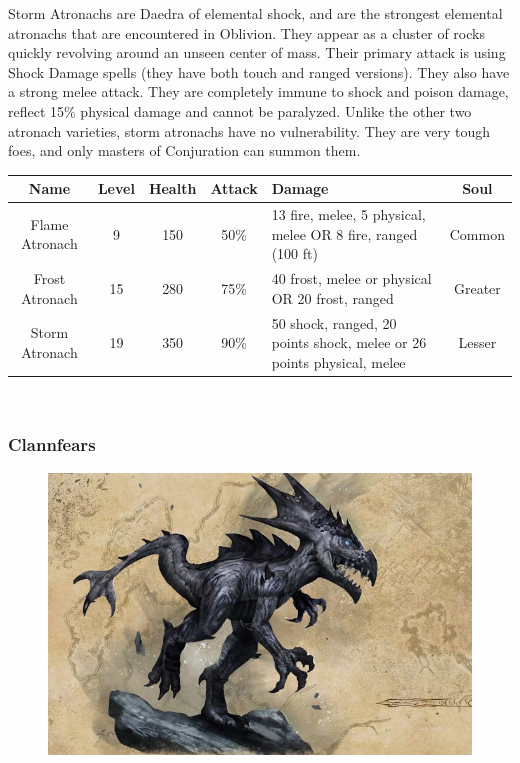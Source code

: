\documentclass[12pt]{book}
\begin{document}
Storm Atronachs are Daedra of elemental shock, and are the strongest elemental atronachs that are encountered in Oblivion. They appear as a cluster of rocks quickly revolving around an unseen center of mass. Their primary attack is using Shock Damage spells (they have both touch and ranged versions). They also have a strong melee attack. They are completely immune to shock and poison damage, reflect 15\% physical damage and cannot be paralyzed. Unlike the other two atronach varieties, storm atronachs have no vulnerability. They are very tough foes, and only masters of Conjuration can summon them.

\begin{tabular}{|c|c|c|c|p{}|c|}
\hline
Name & Level & Health & Attack & Damage & Soul\\ \hline
Flame Atronach & 9 & 150 & 50\% & 13 fire, melee, 5 physical, melee OR 8 fire, ranged (100 ft) & Common\\ \hline
Frost Atronach & 15 & 280 & 75\% & 40 frost, melee or physical OR 20 frost, ranged & Greater\\ \hline
Storm Atronach & 19 & 350 & 90\% & 50 shock, ranged, 20 points shock, melee or 26 points physical, melee & Lesser\\ \hline
\end{tabular}\\

\subsubsection{Clannfears}

\begin{figure}[h]
	\centering
	\includegraphics[scale=0.5]{clannfear.png}
\end{figure}
\end{document}
